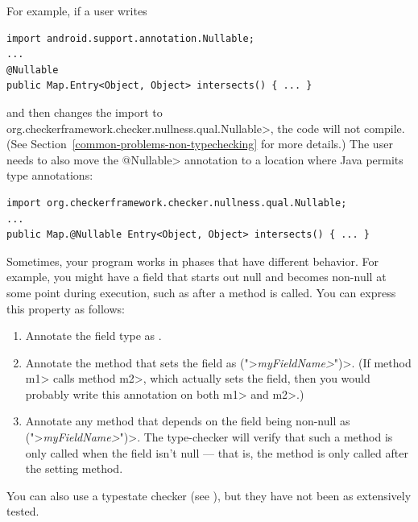 For example, if a user writes

\begin{Verbatim}
import android.support.annotation.Nullable;
...
@Nullable
public Map.Entry<Object, Object> intersects() { ... }
\end{Verbatim}

\noindent
and then changes the import to
\<org.checkerframework.checker.nullness.qual.Nullable>, the code will not
compile.  (See Section~\ref{common-problems-non-typechecking} for more details.)
The user needs to also move the \<@Nullable> annotation to a location where
Java permits type annotations:

\begin{Verbatim}
import org.checkerframework.checker.nullness.qual.Nullable;
...
public Map.@Nullable Entry<Object, Object> intersects() { ... }
\end{Verbatim}





Sometimes, your program works in phases that have different behavior.  For
example, you might have a field that starts out null and becomes non-null
at some point during execution, such as after a method is called.  You can
express this property as follows:

\begin{enumerate}
\item
Annotate the field type as .
\item
Annotate the method that sets the field as \<(">\emph{\<myFieldName>}\<")>.
(If method \<m1> calls method \<m2>, which actually sets the field, then
you would probably write this annotation on both \<m1> and \<m2>.)
\item
Annotate any method that depends on the field being non-null as
\<(">\emph{\<myFieldName>}\<")>.
The type-checker will verify that such a method is only called when the
field isn't null --- that is, the method is only called after the setting
method.
\end{enumerate}

You can also use a typestate checker (see
), but they have not been as extensively
tested.


